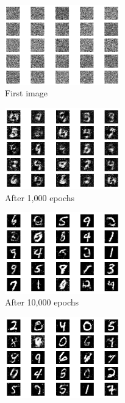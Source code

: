 \documentclass[a4paper]{article}    %
\begin{document}
\begin{figure}[H]
    \centering
    \begin{subfigure}{0.32\textwidth}
        \centering
        \includegraphics[width=5cm]{0}
        \caption{First image}
        \label{fig:fashion_mnist-epoch0}
    \end{subfigure}
    \hfill
    \begin{subfigure}{0.32\textwidth}
        \centering
        \includegraphics[width=5cm]{1000}
        \caption{After 1,000 epochs}
        \label{fig:fashion_mnist-epoch1000}
    \end{subfigure}
    \hfill
    \begin{subfigure}{0.32\textwidth}
        \centering
        \includegraphics[width=5cm]{10000}
        \caption{After 10,000 epochs}
        \label{fig:fashion_mnist-epoch10000}
    \end{subfigure}
    \hfill
    \begin{subfigure}{0.32\textwidth}
        \centering
        \includegraphics[width=5cm]{20000}

\end{subfigure}
\end{figure}
\end{document}
